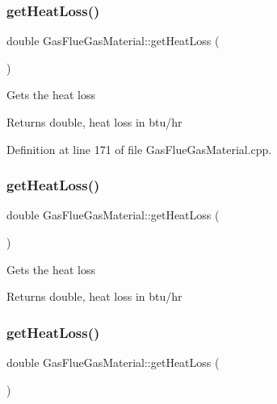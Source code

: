 \subsubsection{\texorpdfstring{get\+Heat\+Loss()}{getHeatLoss()}\hspace{0.1cm}{\footnotesize\ttfamily [1/3]}}
{\footnotesize\ttfamily double Gas\+Flue\+Gas\+Material\+::get\+Heat\+Loss (\begin{DoxyParamCaption}{ }\end{DoxyParamCaption})}

Gets the heat loss

\begin{DoxyReturn}{Returns}
double, heat loss in btu/hr 
\end{DoxyReturn}


Definition at line 171 of file Gas\+Flue\+Gas\+Material.\+cpp.

\mbox{\label{class_gas_flue_gas_material_ad9990d400536c6e8c7c53b9212de400b}} 
\subsubsection{\texorpdfstring{get\+Heat\+Loss()}{getHeatLoss()}\hspace{0.1cm}{\footnotesize\ttfamily [2/3]}}
{\footnotesize\ttfamily double Gas\+Flue\+Gas\+Material\+::get\+Heat\+Loss (\begin{DoxyParamCaption}{ }\end{DoxyParamCaption})}

Gets the heat loss

\begin{DoxyReturn}{Returns}
double, heat loss in btu/hr 
\end{DoxyReturn}
\mbox{\label{class_gas_flue_gas_material_ad9990d400536c6e8c7c53b9212de400b}} 
\subsubsection{\texorpdfstring{get\+Heat\+Loss()}{getHeatLoss()}\hspace{0.1cm}{\footnotesize\ttfamily [3/3]}}
{\footnotesize\ttfamily double Gas\+Flue\+Gas\+Material\+::get\+Heat\+Loss (\begin{DoxyParamCaption}{ }\end{DoxyParamCaption})}

